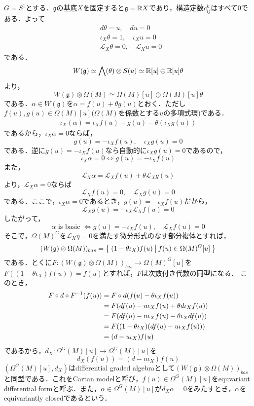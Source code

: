 \begin{eg}
  $G=S^1$とする．$\mathfrak{g}$の基底$X$を固定すると$\mathfrak{g}=\mathbb{R} X$であり，構造定数$c^k_{ij}$はすべて$0$である．よって
  \begin{align*}
    &d\theta = u,\quad du = 0\\
    &\iota_X\theta = 1,\quad\iota_Xu = 0\\
    &\mathcal{L}_X\theta = 0,\quad\mathcal{L}_Xu=0
  \end{align*}
  である．
  \[
  W(\mathfrak{g})\simeq \bigwedge(\theta)\otimes S(u) \simeq \mathbb{R}[u]\oplus \mathbb{R}[u]\theta
  \]
  より，
  \[
  W(\mathfrak{g})\otimes\Omega(M)\simeq \Omega(M)[u]\oplus\Omega(M)[u]\theta
  \]
  である．$\alpha\in W(\mathfrak{g})$を$\alpha = f(u) + \theta g(u)$とおく．ただし$f(u),g(u)\in\Omega(M)[u]$($\Omega(M)$を係数とする$u$の多項式環)である．
  \begin{align*}
    \iota_X(\alpha) = \iota_Xf(u) + g(u) - \theta(\iota_Xg(u))
  \end{align*}
  であるから，$\iota_X\alpha = 0$ならば，
  \[
  g(u) = -\iota_Xf(u),\quad \iota_Xg(u) = 0
  \]
  である．逆に$g(u) = -\iota_Xf(u)$なら自動的に$\iota_Xg(u)=0$であるので，
  \[
  \iota_X\alpha = 0\Leftrightarrow g(u) = -\iota_Xf(u)
  \]
  また，
  \[
  \mathcal{L}_X\alpha = \mathcal{L}_Xf(u) + \theta\mathcal{L}_Xg(u)
  \]
  より，$\mathcal{L}_X\alpha = 0$ならば
  \[
  \mathcal{L}_Xf(u) = 0,\quad \mathcal{L}_Xg(u)=0
  \]
  である．ここで，$\iota_X\alpha = 0$であるとき，$g(u) = -\iota_Xf(u)$だから，
  \[
  \mathcal{L}_Xg(u) = -\iota_X\mathcal{L}_Xf(u)=0
  \]
  したがって，
  \[
  \alpha\text{ is basic }\Leftrightarrow g(u) = -\iota_Xf(u),\quad \mathcal{L}_Xf(u) = 0
  \]
  そこで，$\Omega(M)^G$を$\mathcal{L}_X\eta = 0$を満たす微分形式のなす部分複体とすれば，
  \[
  (W(\mathfrak{g})\otimes\Omega(M))_{bas} = \left\{\:(1-\theta\iota_X)f(u)\:\middle|\:f(u)\in\Omega(M)^G[u]\:\right\}
  \]
  である．とくに$F\colon (W(\mathfrak{g})\otimes\Omega(M))_{bas}\rightarrow \Omega(M)^G[u]$を$F((1-\theta\iota_X)f(u)) = f(u)$とすれば，$F$は次数付き代数の同型になる\cite{tu equivariant}．
  このとき，
  \begin{align*}
    F\circ d\circ F^{-1}(f(u))
    &=F\circ d(f(u) - \theta\iota_Xf(u))\\
    &=F(df(u) - u\iota_Xf(u) + \theta d\iota_Xf(u))\\
    &=F(df(u) - u\iota_Xf(u)-\theta\iota_Xdf(u))\\
    &=F((1-\theta\iota_X)(df(u) - u\iota_Xf(u)))\\
    &=(d-u\iota_X)f(u)
  \end{align*}
  であるから，$d_X\colon\Omega^G(M)[u]\rightarrow \Omega^G(M)[u]$を
  \[
  d_X(f(u)) = (d-u\iota_X)f(u)
  \]
  $(\Omega^G(M)[u],d_X)$はdifferential graded algebraとして$(W(\mathfrak{g})\otimes\Omega(M))_{bas}$と同型である．これをCartan modelと呼び，$f(u)\in\Omega^G(M)[u]$をequvariant differential formと呼ぶ．また，$\alpha\in \Omega^G(M)[u]$が$d_X\alpha = 0$をみたすとき，$\alpha$をequivariantly closedであるという．
\end{eg}


